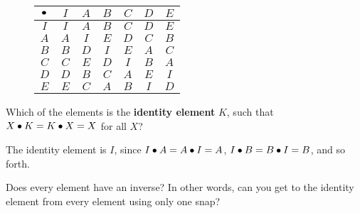 \documentclass[../key.tex]{subfiles}
\begin{document}
%
\begin{figure}[h]
	\begin{center}
		\begin{minipage}[b]{\textwidth}
			\centering
			\begin{tabular}{c|cccccc}
				\hline
				$\bullet$ & $I$ & $A$ & $B$ & $C$ & $D$ & $E$ \\ \hline
				\rowcolor{light-gray}
				$I$ & $I$ & $A$ & $B$ & $C$ & $D$ & $E$ \\
				$A$ & $A$ & $I$ & $E$ & $D$ & $C$ & $B$ \\
				\rowcolor{light-gray}
				$B$ & $B$ & $D$ & $I$ & $E$ & $A$ & $C$ \\
				$C$ & $C$ & $E$ & $D$ & $I$ & $B$ & $A$ \\
				\rowcolor{light-gray}
				$D$ & $D$ & $B$ & $C$ & $A$ & $E$ & $I$ \\
				$E$ & $E$ & $C$ & $A$ & $B$ & $I$ & $D$ \\ \hline
			\end{tabular}
			\vspace*{0.5\baselineskip}
		\end{minipage}
	\end{center}
	\vspace*{-2\baselineskip}
\end{figure}

\begin{outer_problem}
\item Which of the elements is the \textbf{identity element} $K$, such that $X\bullet K = K\bullet X = X$ for all $X$? \label{prob:group_definition_start}
\end{outer_problem}

\noindent The identity element is $I$, since $I\bullet A = A\bullet I = A$, $I\bullet B = B\bullet I = B$, and so forth.

\begin{outer_problem}
\item Does every element have an inverse? In other words, can you get to the identity element from every element using only one snap?
\end{outer_problem}
\end{document}
